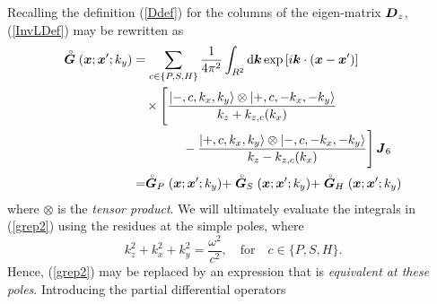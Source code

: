 \documentclass[11pt,a4paper]{article}
\newcommand{\bmi}[1]{\mbox{\boldmath$\mit #1$\unboldmath}}
\newcommand{\rf}[1]{\stackrel{\scriptscriptstyle _{\,\,\circ}}{ #1}}
\begin{document}
Recalling the definition (\ref{Ddef}) for the columns of the eigen-matrix
${\bmi  D}_{z}$, (\ref{InvLDef}) may be rewritten as
\begin{align}\label{grep2}
\rf{\bmi  G}({\bmi  x};{{\bmi  x}}^{\prime};k_y)
&=\sum\limits_{c\in \{P,S,H\}}
{\frac{1}{4{ \pi }^{2}}}\int_{{R}^{2}} {\rm d}{\bmi k} \exp \left[{i {\bmi k}  \cdot
  ({\bmi x}-{\bmi x}^{\prime})}\right]\nonumber\\
&\quad\times\Biggl[\frac{
  \left|-,c, k_{x},k_{y}  \right\rangle\otimes \left|+,c, -k_{x},-k_{y}  \right\rangle
  }{{k}_{z}+{k}_{z, c }({k}_{x})}\nonumber\\
&\qquad\qquad{}-\frac{
\left|+,c, k_{x},k_{y}  \right\rangle\otimes \left|-,c, -k_{x},-k_{y}  \right\rangle
  }{{k}_{z}-{k}_{z, c }({k}_{x})}\Biggr]\,{\bmi J}_{6}
\nonumber\\
&=
\rf{\bmi  G}_{P}({\bmi  x};{{\bmi  x}}^{\prime};k_y)+
\rf{\bmi  G}_{S}({\bmi  x};{{\bmi  x}}^{\prime};k_y)+
\rf{\bmi  G}_{H}({\bmi  x};{{\bmi  x}}^{\prime};k_y)
\end{align}
where  $\otimes$ is the {\em tensor product\/}.
We will ultimately evaluate the integrals in (\ref{grep2}) using the
residues at the simple poles, where
\begin{equation} \label{dispersion}
{k}^2_{z}+{k}^2_{x}+{k}^2_{y}=\frac{\omega^2}{c^2},\quad \mbox{for}\quad c\in\{P,S,H\}.
\end{equation}
Hence,  (\ref{grep2}) may be replaced by an expression that is
{\em equivalent at these poles\/}. Introducing the partial differential
operators
\end{document}
